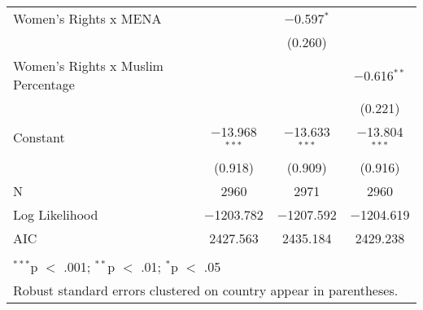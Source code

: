 \begin{table}[!htbp]
\begin{tabular}{@{\extracolsep{5pt}}lccc}
  Women's Rights x MENA &  & $-$0.597$^{*}$ &  \\ 
  &  & (0.260) &  \\ 
  Women's Rights x Muslim Percentage &  &  & $-$0.616$^{**}$ \\ 
  &  &  & (0.221) \\ 
  Constant & $-$13.968$^{***}$ & $-$13.633$^{***}$ & $-$13.804$^{***}$ \\ 
  & (0.918) & (0.909) & (0.916) \\ 
 N & 2960 & 2971 & 2960 \\ 
Log Likelihood & $-$1203.782 & $-$1207.592 & $-$1204.619 \\ 
AIC & 2427.563 & 2435.184 & 2429.238 \\ 
\hline \\[-1.8ex] 
\multicolumn{4}{l}{$^{***}$p $<$ .001; $^{**}$p $<$ .01; $^{*}$p $<$ .05} \\ 
\multicolumn{4}{l}{Robust standard errors clustered on country appear in parentheses.} \\ 
\end{tabular} 
\end{table} 
